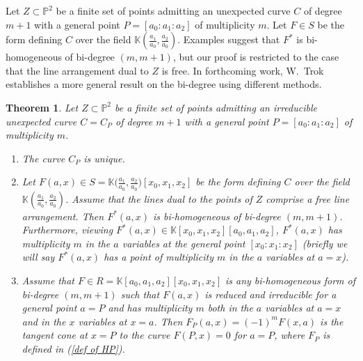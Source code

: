 \documentclass[12pt]{amsart}
\numberwithin{equation}{section}
\newtheorem{theorem}{Theorem}[section]
\theoremstyle{definition}
\newcommand{\PP}{ \ensuremath{\mathbb{P}}}
\newcommand{\KK}{ \ensuremath{\mathbb{K}}}
\begin{document}
Let $Z\subset\PP^2$ be a finite set of points admitting an unexpected curve $C$ of degree $m+1$ with a general point $P=[a_0:a_1:a_2]$
of multiplicity $m$. Let $F\in S$ be the form defining $C$ over the field $\KK(\frac{a_1}{a_0},\frac{a_2}{a_0})$. 
Examples suggest that $F^*$ is bi-homogeneous of bi-degree $(m,m+1)$, but our proof is restricted to the case that
the line arrangement dual to $Z$ is free. 
In forthcoming work, W.\ Trok \cite{Tr} establishes a more general result on the bi-degree using different methods.





\begin{theorem}\label{BMSSDualityThm}
Let $Z\subset\PP^2$ be a finite set of points admitting an irreducible unexpected curve $C=C_P$ of degree $m+1$ with a general point $P=[a_0:a_1:a_2]$
of multiplicity $m$.  
\begin{enumerate}
\item[(a)] The curve $C_P$ is unique.

\item[(b)] Let $F(a,x)\in S=\KK\big(\frac{a_1}{a_0},\frac{a_2}{a_0}\big)[x_0,x_1,x_2]$ 
be the form defining $C$ over the field $\KK(\frac{a_1}{a_0},\frac{a_2}{a_0})$.
Assume that the lines dual to the points of $Z$ comprise a free line arrangement. Then $F^*(a,x)$ is bi-homogeneous of bi-degree $(m,m+1)$.
Furthermore, viewing $F^*(a,x) \in \KK[x_0,x_1,x_2][a_0,a_1,a_2]$, $F^*(a,x)$ has multiplicity $m$ in the 
$a$ variables at the general point $[x_0:x_1:x_2]$ (briefly we will say $F^*(a,x)$ has a point of multiplicity $m$ in the $a$ variables at $a=x$).

\item[(c)] Assume that $F\in R=\KK[a_0,a_1,a_2][x_0,x_1,x_2]$ is any bi-homogeneous form of bi-degree $(m,m+1)$
such that $F(a,x)$ is reduced and irreducible for a general point $a=P$ and has multiplicity $m$ both in the $a$ variables at $a=x$ and 
in the $x$ variables at $x=a$.
Then $F_P(a,x)=(-1)^mF(x,a)$ is the tangent cone at $x=P$ to the curve $F(P,x)=0$ for $a=P$, where $F_P$ is defined in (\ref{def of HP}).
\end{enumerate}
\end{theorem}
\end{document}
